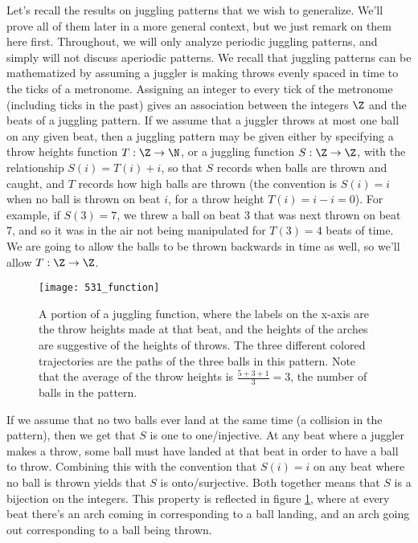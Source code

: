 \documentclass[12nt]{article}
\theoremstyle{plain}
\begin{document}
Let's recall the results on juggling patterns that we wish to generalize. We'll prove all of them later in a more general context, but we just remark on them here first. Throughout, we will only analyze periodic juggling patterns, and simply will not discuss aperiodic patterns. We recall that juggling patterns can be mathematized by assuming a juggler is making throws evenly spaced in time to the ticks of a metronome. Assigning an integer to every tick of the metronome (including ticks in the past) gives an association between the integers $\Z$ and the beats of a juggling pattern. If we assume that a juggler throws at most one ball on any given beat, then a juggling pattern may be given either by specifying a throw heights function $T : \Z \to \N$, or a juggling function $S : \Z \to \Z$, with the relationship $S(i) = T(i) + i$, so that $S$ records when balls are thrown and caught, and $T$ records how high balls are thrown (the convention is $S(i) = i$ when no ball is thrown on beat $i$, for a throw height $T(i) = i - i = 0$). For example, if $S(3) = 7$, we threw a ball on beat 3 that was next thrown on beat 7, and so it was in the air not being manipulated for $T(3) = 4$ beats of time. We are going to allow the balls to be thrown backwards in time as well, so we'll allow $T : \Z \to \Z$. 

\begin{figure}[ht]
\texttt{[image: 531\_function]}
\caption{A portion of a juggling function, where the labels on the x-axis are the throw heights made at that beat, and the heights of the arches are suggestive of the heights of throws. The three different colored trajectories are the paths of the three balls in this pattern. Note that the average of the throw heights is $\frac{5 + 3 + 1}{3} = 3$, the number of balls in the pattern.}
\label{531_function}
\end{figure}


If we assume that no two balls ever land at the same time (a collision in the pattern), then we get that $S$ is one to one/injective. At any beat where a juggler makes a throw, some ball must have landed at that beat in order to have a ball to throw. Combining this with the convention that $S(i) = i$ on any beat where no ball is thrown yields that $S$ is onto/surjective. Both together means that $S$ is a bijection on the integers. This property is reflected in figure \ref{531_function}, where at every beat there's an arch coming in corresponding to a ball landing, and an arch going out corresponding to a ball being thrown. 
\end{document}
